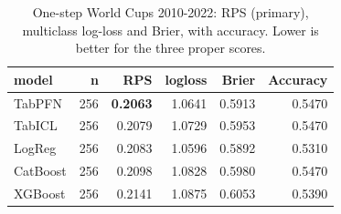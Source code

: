 \begin{table}[t]
  \centering
  \caption{One-step World Cups 2010-2022: RPS (primary), multiclass log-loss and Brier, with accuracy. Lower is better for the three proper scores.}
  \label{tab:rev_c1_onestep_worldcup}
  \begin{tabular}{lrrrrr}
  \toprule
  model & n & RPS & logloss & Brier & Accuracy \\
  \midrule
  TabPFN & 256 & \textbf{0.2063} & 1.0641 & 0.5913 & 0.5470 \\
  TabICL & 256 & 0.2079 & 1.0729 & 0.5953 & 0.5470 \\
  LogReg & 256 & 0.2083 & 1.0596 & 0.5892 & 0.5310 \\
  CatBoost & 256 & 0.2098 & 1.0828 & 0.5980 & 0.5470 \\
  XGBoost & 256 & 0.2141 & 1.0875 & 0.6053 & 0.5390 \\
  \bottomrule
  \end{tabular}
\end{table}
